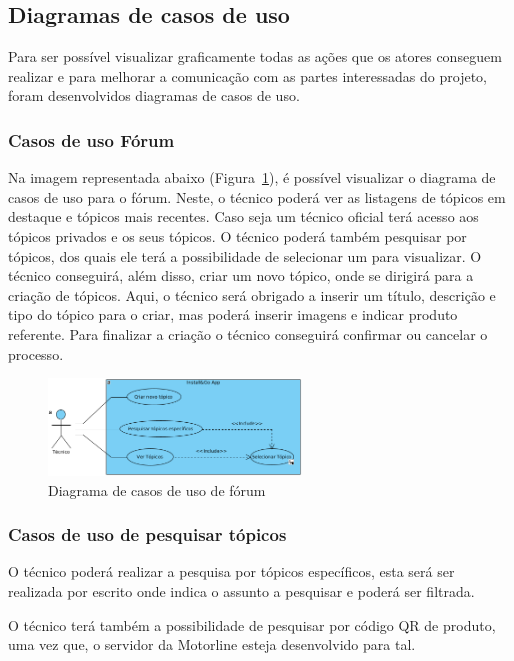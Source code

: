 
\subsection{Diagramas de casos de uso}
Para ser possível visualizar graficamente todas as ações que os 
atores conseguem realizar e para melhorar a comunicação com as 
partes interessadas do projeto, foram desenvolvidos diagramas de 
casos de uso.

\subsubsection{Casos de uso Fórum}
Na imagem representada abaixo (Figura~\ref{fig:12}), é possível 
visualizar o diagrama de casos de uso para o fórum.
Neste, o técnico poderá ver as listagens de tópicos em destaque e tópicos mais recentes. Caso seja um técnico oficial terá acesso aos tópicos privados e os seus tópicos.
O técnico poderá também pesquisar por tópicos, dos quais ele terá a possibilidade de selecionar um para visualizar. 
O técnico conseguirá, além disso, criar um novo tópico, onde se dirigirá para a criação de tópicos. Aqui, o técnico será obrigado a inserir um título, descrição e tipo do tópico para o criar, 
mas poderá inserir imagens e indicar produto referente.
Para finalizar a criação o técnico conseguirá confirmar ou cancelar o processo. 

\begin{figure}[htb]
    \centering
    \includegraphics[width=0.6\textwidth]{images/diagramas/casos_de_uso/use_case_forum.png}
    \caption{Diagrama de casos de uso de fórum}
    \label{fig:12}
\end{figure}

\subsubsection{Casos de uso de pesquisar tópicos}

O técnico poderá realizar a pesquisa por tópicos específicos, 
esta será ser realizada por escrito onde indica o assunto a pesquisar e poderá ser filtrada.

O técnico terá também a possibilidade de pesquisar por código QR de produto, uma vez que, o servidor da Motorline esteja desenvolvido para tal.

